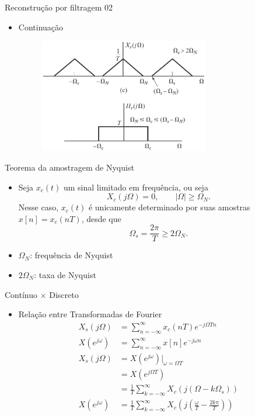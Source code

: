 \begin{slide}{Reconstrução por filtragem 02}
\begin{itemize}
   \item Continuação
   \begin{figure}
      \centering
      \includegraphics[width=0.7\textwidth]{figs/reconstr01a.eps}
   \end{figure}
\end{itemize}
\end{slide}

\begin{slide}{Teorema da amostragem de Nyquist}
\begin{itemize}
   \item Seja $x_c(t)$ um sinal limitado em frequ\^encia, ou seja
   \begin{equation}
       X_c(j\Omega) = 0, \qquad |\Omega|\geq\Omega_N.
   \end{equation}
   Nesse caso, $x_c(t)$ \'e unicamente determinado por suas amostras $x[n]=x_c(nT)$, desde que 
   \begin{equation}
       \Omega_s = \frac{2\pi}{T}\geq 2\Omega_N.
   \end{equation}
   \item $\Omega_N$: frequ\^encia de Nyquist
   \item $2\Omega_N$: taxa de Nyquist
\end{itemize}
\end{slide}

\begin{slide}{Contínuo $\times$ Discreto}
\begin{itemize}
   \item Rela\c c\~ao entre Transformadas de Fourier 
   \begin{align}
      X_s(j\Omega)   &= \sum_{n=-\infty}^{\infty}x_c(nT)e^{-j\Omega Tn}\\
      X(e^{j\omega}) &= \sum_{n=-\infty}^{\infty}x[n]e^{-j\omega n}\\
      X_s(j\Omega)   &= X(e^{j\omega})|_{\omega=\Omega T}\\
                     &= X(e^{j\Omega T}) \\
                     &= \frac{1}{T}\sum_{k=-\infty}^{\infty}X_c(j(\Omega-k\Omega_s))\\
     X(e^{j\omega})& = \frac{1}{T}\sum_{k=-\infty}^{\infty}X_c\left(j\left(\frac{\omega}{T}-\frac{2k\pi}{T}\right )\right )
   \end{align}
\end{itemize}
\end{slide}

